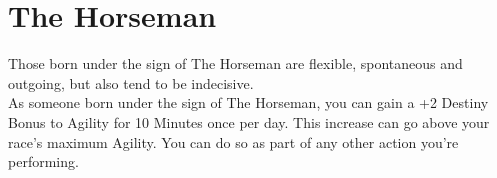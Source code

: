 \section{The Horseman}\label{zodiac:horseman}

Those born under the sign of The Horseman are flexible, spontaneous and outgoing, but also tend to be indecisive.\\
As someone born under the sign of The Horseman, you can gain a +2 Destiny Bonus to Agility for 10 Minutes once per day.
This increase can go above your race's maximum Agility.
You can do so as part of any other action you're performing.\\